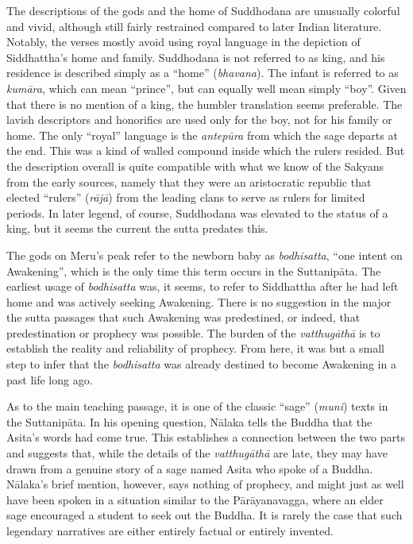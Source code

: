 \documentclass[12pt,openany]{book}%
\begin{document}
The descriptions of the gods and the home of Suddhodana are unusually colorful and vivid, although still fairly restrained compared to later Indian literature. Notably, the verses mostly avoid using royal language in the depiction of Siddhattha’s home and family. Suddhodana is not referred to as king, and his residence is described simply as a “home” (\textit{bhavana}). The infant is referred to as \textit{\textsanskrit{kumāra}}, which can mean “prince”, but can equally well mean simply “boy”. Given that there is no mention of a king, the humbler translation seems preferable. The lavish descriptors and honorifics are used only for the boy, not for his family or home. The only “royal” language is the \textit{\textsanskrit{antepūra}} from which the sage departs at the end. This was a kind of walled compound inside which the rulers resided. But the description overall is quite compatible with what we know of the Sakyans from the early sources, namely that they were an aristocratic republic that elected “rulers” (\textit{\textsanskrit{rājā}}) from the leading clans to serve as rulers for limited periods. In later legend, of course, Suddhodana was elevated to the status of a king, but it seems the current the sutta predates this.

The gods on Meru’s peak refer to the newborn baby as \textit{bodhisatta}, “one intent on Awakening”, which is the only time this term occurs in the \textsanskrit{Suttanipāta}. The earliest usage of \textit{bodhisatta} was, it seems, to refer to Siddhattha after he had left home and was actively seeking Awakening. There is no suggestion in the major the sutta passages that such Awakening was predestined, or indeed, that predestination or prophecy was possible. The burden of the \textit{\textsanskrit{vatthugāthā}} is to establish the reality and reliability of prophecy. From here, it was but a small step to infer that the \textit{bodhisatta} was already destined to become Awakening in a past life long ago.

As to the main teaching passage, it is one of the classic “sage” (\textit{muni}) texts in the \textsanskrit{Suttanipāta}. In his opening question, \textsanskrit{Nālaka} tells the Buddha that the Asita’s words had come true. This establishes a connection between the two parts and suggests that, while the details of the \textit{\textsanskrit{vatthugāthā}} are late, they may have drawn from a genuine story of a sage named Asita who spoke of a Buddha. \textsanskrit{Nālaka}’s brief mention, however, says nothing of prophecy, and might just as well have been spoken in a situation similar to the \textsanskrit{Pārāyanavagga}, where an elder sage encouraged a student to seek out the Buddha. It is rarely the case that such legendary narratives are either entirely factual or entirely invented.
\end{document}
